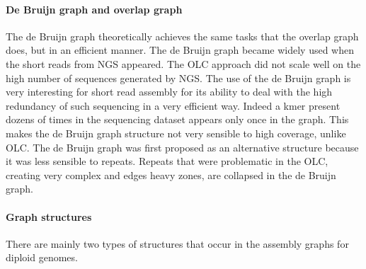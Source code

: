 \paragraph{De Bruijn graph and overlap graph}
The de Bruijn graph theoretically achieves
the same tasks that the overlap graph does, but in an efficient manner.
The de Bruijn graph became widely used when the short reads from NGS appeared. The OLC
approach did not scale well on the high number of sequences generated by NGS. The
use of the de Bruijn graph is very interesting for short read assembly for its ability to
deal with the high redundancy of such sequencing in a very efficient way. Indeed a kmer
present dozens of times in the sequencing dataset appears only once in the graph. This
makes the de Bruijn graph structure not very sensible to high coverage, unlike
OLC. The de Bruijn graph was first proposed as an alternative structure \citep{pevzner2001eulerian} because it
was less sensible to repeats. Repeats that were problematic in the OLC, creating very
complex and edges heavy zones, are collapsed in the de Bruijn graph.

\paragraph{Graph structures} There are mainly two types of structures that occur in the assembly graphs for diploid genomes.


